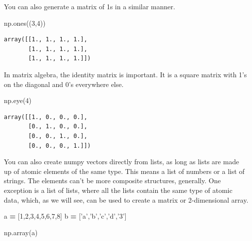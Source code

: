 \documentclass[
  letterpaper,
]{scrbook}
\newenvironment{Shaded}{\begin{snugshade}}{\end{snugshade}}
\newcommand{\DecValTok}[1]{\textcolor[rgb]{0.00,0.00,0.81}{#1}}
\newcommand{\NormalTok}[1]{#1}
\newcommand{\OperatorTok}[1]{\textcolor[rgb]{0.81,0.36,0.00}{\textbf{#1}}}
\newcommand{\StringTok}[1]{\textcolor[rgb]{0.31,0.60,0.02}{#1}}
\begin{document}
You can also generate a matrix of 1s in a similar manner.

\begin{Shaded}
\begin{Highlighting}[]
\NormalTok{np.ones((}\DecValTok{3}\NormalTok{,}\DecValTok{4}\NormalTok{))}
\end{Highlighting}
\end{Shaded}

\begin{verbatim}
array([[1., 1., 1., 1.],
       [1., 1., 1., 1.],
       [1., 1., 1., 1.]])
\end{verbatim}

In matrix algebra, the identity matrix is important. It is a square matrix with 1's on the diagonal and 0's everywhere else.

\begin{Shaded}
\begin{Highlighting}[]
\NormalTok{np.eye(}\DecValTok{4}\NormalTok{)}
\end{Highlighting}
\end{Shaded}

\begin{verbatim}
array([[1., 0., 0., 0.],
       [0., 1., 0., 0.],
       [0., 0., 1., 0.],
       [0., 0., 0., 1.]])
\end{verbatim}

You can also create numpy vectors directly from lists, as long as lists are made up of atomic elements of the same type. This means a list of numbers or a list of strings. The elements can't be more composite structures, generally. One exception is a list of lists, where all the lists contain the same type of atomic data, which, as we will see, can be used to create a matrix or 2-dimensional array.

\begin{Shaded}
\begin{Highlighting}[]
\NormalTok{a }\OperatorTok{=}\NormalTok{ [}\DecValTok{1}\NormalTok{,}\DecValTok{2}\NormalTok{,}\DecValTok{3}\NormalTok{,}\DecValTok{4}\NormalTok{,}\DecValTok{5}\NormalTok{,}\DecValTok{6}\NormalTok{,}\DecValTok{7}\NormalTok{,}\DecValTok{8}\NormalTok{]}
\NormalTok{b }\OperatorTok{=}\NormalTok{ [}\StringTok{'a'}\NormalTok{,}\StringTok{'b'}\NormalTok{,}\StringTok{'c'}\NormalTok{,}\StringTok{'d'}\NormalTok{,}\StringTok{'3'}\NormalTok{]}

\NormalTok{np.array(a)}
\end{Highlighting}
\end{Shaded}
\end{document}
